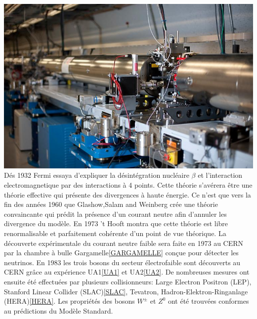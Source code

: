 {
\centering
\includegraphics[width=\marginparwidth]{SM/slac.jpg}
\label{SLAC}
} Dés 1932 Fermi essaya d'expliquer la désintégration nucléaire $\beta$ et l'interaction electromagnetique par des interactions à 4 points. Cette théorie  s'avérera être une théorie effective qui présente des divergences à haute énergie. Ce n'est que vers la fin des années 1960 que Glashow,Salam and Weinberg crée une théorie convaincante qui prédit la présence d'un courant neutre afin d'annuler les divergence du modèle. En 1973 't Hooft montra que cette théorie est libre renormalisable et parfaitement cohérente d'un point de vue théorique. La découverte expérimentale du courant neutre faible sera faite en 1973 au CERN par la chambre à bulle Gargamelle\ref{GARGAMELLE} conçue pour détecter les neutrinos. En 1983 les trois bosons du secteur électrofaible sont découverts au CERN grâce au expérience UA1\ref{UA1} et UA2\ref{UA2}.
De nombreuses mesures ont ensuite été effectuées par plusieurs collisionneurs: Large Electron Positron (LEP), Stanford Linear Collider (SLAC)\ref{SLAC}, Tevatron, Hadron-Elektron-Ringanlage (HERA)\ref{HERA}. Les propriétés des bosons $W^{\pm}$ et $Z^{0}$ ont été trouvées conformes au prédictions du Modèle Standard. 

